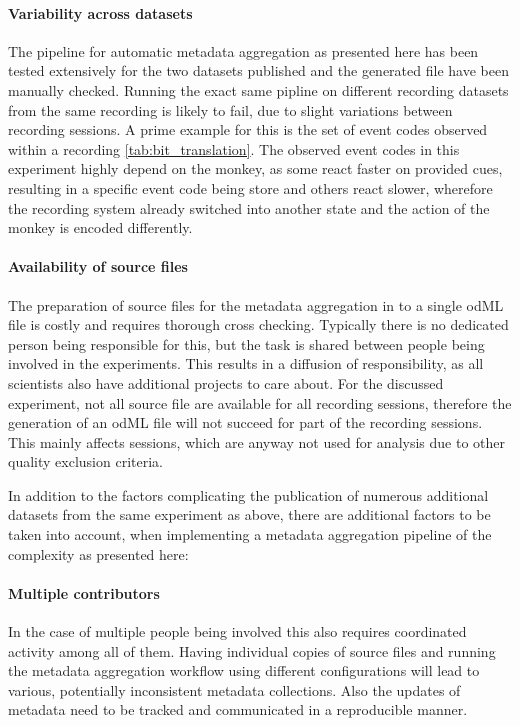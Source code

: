\paragraph{Variability across datasets}
The pipeline for automatic metadata aggregation as presented here has been tested extensively for the two datasets published and the generated file have been manually checked. Running the exact same pipline on different recording datasets from the same recording is likely to fail, due to slight variations between recording sessions. A prime example for this is the set of event codes observed within a recording \ref{tab:bit_translation}. The observed event codes in this experiment highly depend on the monkey, as some react faster on provided cues, resulting in a specific event code being store and others react slower, wherefore the recording system already switched into another state and the action of the monkey is encoded differently.

\paragraph{Availability of source files}
The preparation of source files for the metadata aggregation in to a single odML file is costly and requires thorough cross checking. Typically there is no dedicated person being responsible for this, but the task is shared between people being involved in the experiments. This results in a diffusion of responsibility, as all scientists also have additional projects to care about. For the discussed experiment, not all source file are available for all recording sessions, therefore the generation of an odML file will not succeed for part of the recording sessions. This mainly affects sessions, which are anyway not used for analysis due to other quality exclusion criteria.
\newline

In addition to the factors complicating the publication of numerous additional datasets from the same experiment as above, there are additional factors to be taken into account, when implementing a metadata aggregation pipeline of the complexity as presented here:

\paragraph{Multiple contributors}
In the case of multiple people being involved this also requires coordinated activity among all of them. Having individual copies of source files and running the metadata aggregation workflow using different configurations will lead to various, potentially inconsistent metadata collections. Also the updates of metadata need to be tracked and communicated in a reproducible manner.

